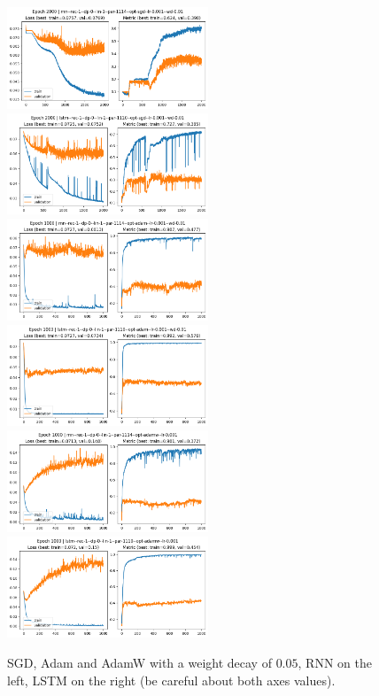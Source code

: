 \documentclass[a4paper,10pt]{article}
\begin{document}
\begin{figure}[H]
      \begin{center}
            \includegraphics[width=6cm]{figures/rnn--rec-1--dp-0--lin-1--par-1114--opt-sgd--lr-0.001--wd-0.01--e-2000.png}
            \includegraphics[width=6cm]{figures/lstm--rec-1--dp-0--lin-1--par-1110--opt-sgd--lr-0.001--wd-0.01--e-2000.png}
            \includegraphics[width=6cm]{figures/rnn--rec-1--dp-0--lin-1--par-1114--opt-adam--lr-0.001--wd-0.01--e-1000.png}
            \includegraphics[width=6cm]{figures/lstm--rec-1--dp-0--lin-1--par-1110--opt-adam--lr-0.001--wd-0.01--e-1000.png}
            \includegraphics[width=6cm]{figures/rnn--rec-1--dp-0--lin-1--par-1114--opt-adamw--lr-0.001--e-1000.png}
            \includegraphics[width=6cm]{figures/lstm--rec-1--dp-0--lin-1--par-1110--opt-adamw--lr-0.001--e-1000.png}
      \end{center}
      \caption{SGD, Adam and AdamW with a weight decay of $0.05$, RNN on the left, LSTM on the right (be careful about both axes values).}
      \label{fig5}
\end{figure}
\end{document}
